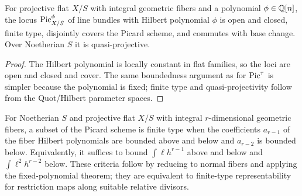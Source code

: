 \begin{theorem}\label{kps-thm-fixed-polynomial}
For projective flat $X/S$ with integral geometric fibers and a polynomial
$\phi\in\mathbb Q[n]$, the locus $\operatorname{Pic}^\phi_{X/S}$ of line bundles with Hilbert
polynomial $\phi$ is open and closed, finite type, disjointly covers the Picard
scheme, and commutes with base change. Over Noetherian $S$ it is
quasi-projective.
\end{theorem}
\begin{proof}
The Hilbert polynomial is locally constant in flat families, so the loci are
open and closed and cover. The same boundedness argument as for $\operatorname{Pic}^\tau$ is
simpler because the polynomial is fixed; finite type and quasi-projectivity
follow from the Quot/Hilbert parameter spaces.
\end{proof}

\begin{remark}\label{kps-rmk-fixed-polynomial-bounds}
For Noetherian $S$ and projective flat $X/S$ with integral $r$-dimensional
geometric fibers, a subset of the Picard scheme is finite type when the
coefficients $a_{r-1}$ of the fiber Hilbert polynomials are bounded above and
below and $a_{r-2}$ is bounded below. Equivalently, it suffices to bound
$\int\ell h^{r-1}$ above and below and $\int\ell^2h^{r-2}$ below. These
criteria follow by reducing to normal fibers and applying the fixed-polynomial
theorem; they are equivalent to finite-type representability for restriction
maps along suitable relative divisors.
\end{remark}

